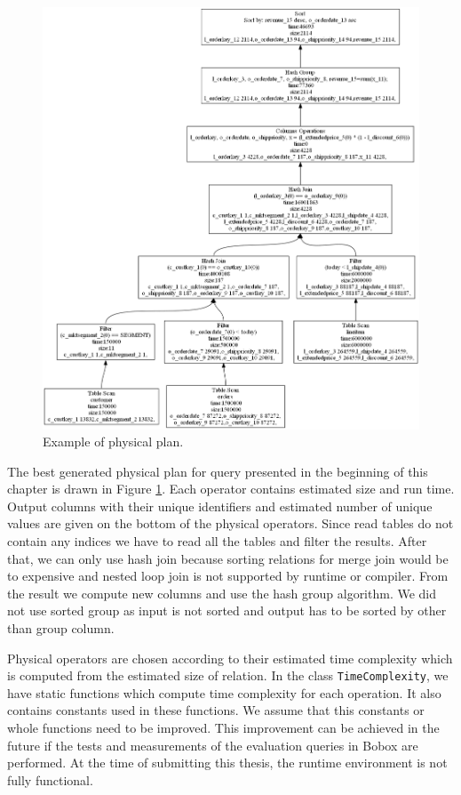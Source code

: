 \begin{figure}[h!]
  \centering
    \includegraphics[width=1.0\textwidth]{physicalplan}

      \caption{Example of physical plan.}
          \label{fig:physicalplan}
\end{figure}


The best generated physical plan for query presented in the beginning of this chapter is drawn in Figure \ref{fig:physicalplan}. Each operator contains estimated size and run time. Output columns with their unique identifiers and estimated number of unique values are given on the bottom of the physical operators. Since read tables do not contain any indices we have to read all the tables and filter the results. After that, we can only use hash join because sorting relations for merge join would be to expensive and nested loop join is not supported by runtime or compiler. From the result we compute new columns and use the hash group algorithm. We did not use sorted group as input is not sorted and output has to be sorted by other than group column.

Physical operators are chosen according to their estimated time complexity which is computed from the estimated size of relation. In the class \texttt{TimeComplexity}, we have static functions which compute time complexity for each operation. It also contains constants used in these functions. We assume that this constants or whole functions need to be improved. This improvement can be achieved in the future if the tests and measurements of the evaluation queries in Bobox are performed. At the time of submitting this thesis, the runtime environment is not fully functional.




